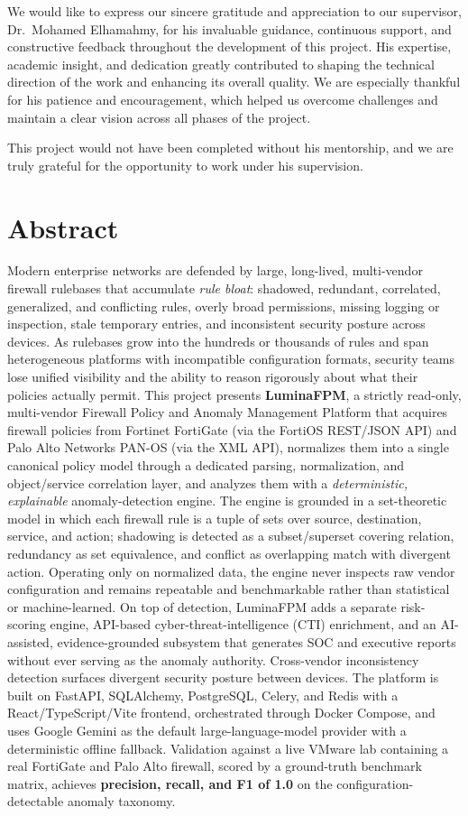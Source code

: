 \documentclass[12pt,a4paper]{report}
\renewcommand{\_}{\textunderscore\allowbreak}
\begin{document}
We would like to express our sincere gratitude and appreciation to our supervisor,
Dr.\ Mohamed Elhamahmy, for his invaluable guidance, continuous support, and constructive feedback
throughout the development of this project. His expertise, academic insight, and dedication greatly
contributed to shaping the technical direction of the work and enhancing its overall quality. We are
especially thankful for his patience and encouragement, which helped us overcome challenges and
maintain a clear vision across all phases of the project.

This project would not have been completed without his mentorship, and we are truly grateful for the
opportunity to work under his supervision.
\clearpage
\chapter*{Abstract}
%
Modern enterprise networks are defended by large, long-lived, multi-vendor firewall rulebases that accumulate \emph{rule bloat}: shadowed, redundant, correlated, generalized, and conflicting rules, overly broad permissions, missing logging or inspection, stale temporary entries, and inconsistent security posture across devices. As rulebases grow into the hundreds or thousands of rules and span heterogeneous platforms with incompatible configuration formats, security teams lose unified visibility and the ability to reason rigorously about what their policies actually permit. This project presents \textbf{LuminaFPM}, a strictly read-only, multi-vendor Firewall Policy and Anomaly Management Platform that acquires firewall policies from Fortinet FortiGate (via the FortiOS REST/JSON API) and Palo Alto Networks PAN-OS (via the XML API), normalizes them into a single canonical policy model through a dedicated parsing, normalization, and object/service correlation layer, and analyzes them with a \emph{deterministic, explainable} anomaly-detection engine. The engine is grounded in a set-theoretic model in which each firewall rule is a tuple of sets over source, destination, service, and action; shadowing is detected as a subset/superset covering relation, redundancy as set equivalence, and conflict as overlapping match with divergent action. Operating only on normalized data, the engine never inspects raw vendor configuration and remains repeatable and benchmarkable rather than statistical or machine-learned. On top of detection, LuminaFPM adds a separate risk-scoring engine, API-based cyber-threat-intelligence (CTI) enrichment, and an AI-assisted, evidence-grounded subsystem that generates SOC and executive reports without ever serving as the anomaly authority. Cross-vendor inconsistency detection surfaces divergent security posture between devices. The platform is built on FastAPI, SQLAlchemy, PostgreSQL, Celery, and Redis with a React/TypeScript/Vite frontend, orchestrated through Docker Compose, and uses Google Gemini as the default large-language-model provider with a deterministic offline fallback. Validation against a live VMware lab containing a real FortiGate and Palo Alto firewall, scored by a ground-truth benchmark matrix, achieves \textbf{precision, recall, and F1 of 1.0} on the configuration-detectable anomaly taxonomy.
\end{document}
